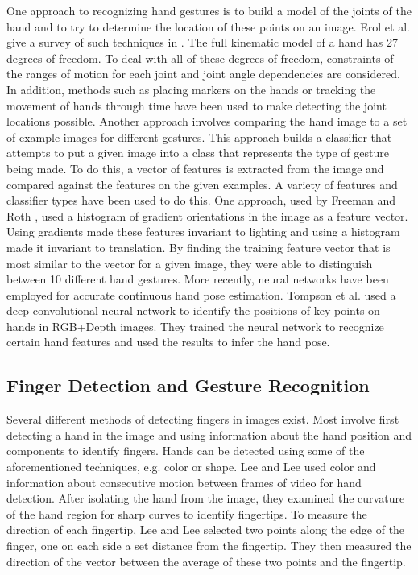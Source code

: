 \documentclass[10pt,twocolumn,letterpaper]{article}
\begin{document}
One approach to recognizing hand gestures is to build a model of the joints of the hand and to try to determine the location of these points on an image. Erol et al. give a survey of such techniques in \cite{erol2007vision}. The full kinematic model of a hand has 27 degrees of freedom. To deal with all of these degrees of freedom, constraints of the ranges of motion for each joint and joint angle dependencies are considered. In addition, methods such as placing markers on the hands or tracking the movement of hands through time have been used to make detecting the joint locations possible.
Another approach involves comparing the hand image to a set of example images for different gestures. This approach builds a classifier that attempts to put a given image into a class that represents the type of gesture being made. To do this, a vector of features is extracted from the image and compared against the features on the given examples. A variety of features and classifier types have been used to do this.
One approach, used by Freeman and Roth \cite{freeman1995orientation}, used a histogram of gradient orientations in the image as a feature vector. Using gradients made these features invariant to lighting and using a histogram made it invariant to translation. By finding the training feature vector that is most similar to the vector for a given image, they were able to distinguish between 10 different hand gestures.
More recently, neural networks have been employed for accurate continuous hand pose estimation. Tompson et al. \cite{tompson2014real} used a deep convolutional neural network to identify the positions of key points on hands in RGB+Depth images. They trained the neural network to recognize certain hand features and used the results to infer the hand pose.

\subsection{Finger Detection and Gesture Recognition}

Several different methods of detecting fingers in images exist. Most involve first detecting a hand in the image and using information about the hand position and components to identify fingers. Hands can be detected using some of the aforementioned techniques, e.g. color or shape. Lee and Lee \cite{lee2011vision} used color and information about consecutive motion between frames of video for hand detection. After isolating the hand from the image, they examined the curvature of the hand region for sharp curves to identify fingertips. To measure the direction of each fingertip, Lee and Lee selected two points along the edge of the finger, one on each side a set distance from the fingertip. They then measured the direction of the vector between the average of these two points and the fingertip.
\end{document}
